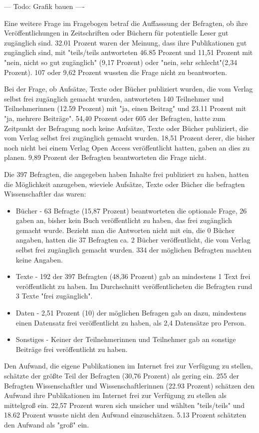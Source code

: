 --- Todo: Grafik bauen ----

Eine weitere Frage im Fragebogen betraf die Auffasssung der Befragten, ob ihre Veröffentlichungen in Zeitschriften oder Büchern für potentielle Leser gut zugänglich sind. 32.01 Prozent waren der Meinung, dass ihre Publikationen gut zugänglich sind, mit "teils/teils antworteten 46.85 Prozent und 11,51 Prozent mit "nein, nicht so gut zugänglich" (9,17 Prozent) oder "nein, sehr schlecht"(2,34 Prozent). 107 oder 9,62 Prozent wussten die Frage nicht zu beantworten.

Bei der Frage, ob Aufsätze, Texte oder Bücher publiziert wurden, die vom Verlag selbst frei zugänglich gemacht wurden, antworteten 140 Teilnehmer und Teilnehmerinnen (12.59 Prozent) mit "ja, einen Beitrag" und 23.11 Prozent mit "ja, mehrere Beiträge". 54,40 Prozent oder 605 der Befragten, hatte zum Zeitpunkt der Befragung noch keine Aufsätze, Texte oder Bücher publiziert, die vom Verlag selbst frei zugänglich gemacht wurden.  18,51 Prozent derer, die bisher noch nicht bei einem Verlag Open Access veröffentlicht hatten, gaben an dies zu planen. 9,89 Prozent der Befragten beantworteten die Frage nicht.

Die 397 Befragten, die angegeben haben Inhalte frei publiziert zu haben, hatten die Möglichkeit anzugeben, wieviele Aufsätze, Texte oder Bücher die befragten Wissenschaftler das waren:
\begin{itemize}
\item Bücher - 63 Befragte (15,87 Prozent) beantworteten die optionale Frage, 26 gaben an, bisher kein Buch veröffentlicht zu haben, das frei zugänglich gemacht wurde. Bezieht man die Antworten nicht mit ein, die 0 Bücher angaben, hatten die 37 Befragten ca. 2 Bücher veröffentlicht, die vom Verlag selbst frei zugänglich gemacht wurden. 334 der möglichen Befragten machten keine Angaben.
\item Texte - 192 der 397 Befragten (48,36 Prozent) gab an mindestens 1 Text frei veröffentlicht zu haben. Im Durchschnitt veröffentlicheten die Befragten rund 3 Texte "frei zugänglich".
\item Daten - 2,51 Prozent (10) der möglichen Befragen gab an dazu, mindestens einen Datensatz frei veröffentlicht zu haben, als 2,4 Datensätze pro Person.
\item Sonstiges - Keiner der Teilnehmerinnen und Teilnehmer gab an sonstige Beiträge frei veröffentlicht zu haben.
\end{itemize}

Den Aufwand, die eigene Publikationen im Internet frei zur Verfügung zu stellen, schätzte der größte Teil der Befragten (30,76 Prozent) als gering ein. 255 der Befragten Wissenschaftler und Wissenschaftlerinnen (22.93 Prozent) schätzen den Aufwand ihre Publikationen im Internet frei zur Verfügung zu stellen als mittelgroß ein.  22,57 Prozent waren sich unsicher und wählten "teils/teils" und 18.62 Prozent wusste nicht den Aufwand einzuschätzen. 5.13 Prozent schätzten den Aufwand als "groß" ein.

